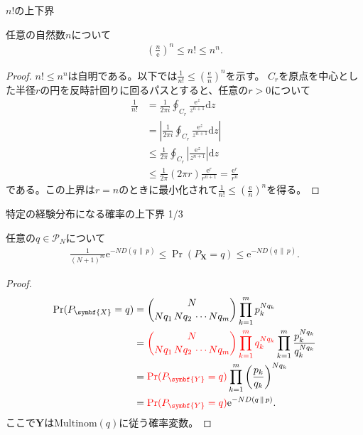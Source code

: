 \documentclass[lualatex,handout]{beamer}
\newcommand{\mycolor}[2]{%
  \begingroup
  \colorlet{currentcolor}{.}%
  \color{#1}#2%
  \color{currentcolor}%
  \endgroup
}
\newcommand{\emm}[1]{\mycolor{red}{#1}}
\newcommand\KL[2]{D(#1\,\|\,#2)}
\theoremstyle{definition}
\begin{document}
\begin{frame}{$n!$の上下界}
\footnotesize
\begin{lemma}
任意の自然数$n$について
\begin{align*}
\left(\frac{n}{\mathrm{e}}\right)^n\le n!\le n^n.
\end{align*}
\vspace{-1em}
\begin{proof}
$n!\le n^n$は自明である。以下では$\frac1{n!}\le \left(\frac{\mathrm{e}}{n}\right)^n$を示す。
%
$C_r$を原点を中心とした半径$r$の円を反時計回りに回るパスとすると、任意の$r>0$について
\begin{align*}
\frac1{n!} &= \frac1{2\pi i} \oint_{C_r} \frac{\mathrm{e}^z}{z^{n+1}}\mathrm{d}z\\
 &= \left|\frac1{2\pi i} \oint_{C_r} \frac{\mathrm{e}^z}{z^{n+1}}\mathrm{d}z\right|\\
&\le \frac1{2\pi } \oint_{C_r} \left|\frac{\mathrm{e}^z}{z^{n+1}}\right|\mathrm{d}z\\
&\le \frac1{2\pi } (2\pi r) \frac{\mathrm{e}^r}{r^{n+1}} = \frac{\mathrm{e}^r}{r^n}
\end{align*}
である。この上界は$r=n$のときに最小化されて$\frac1{n!}\le\left(\frac{\mathrm{e}}{n}\right)^n$を得る。
\end{proof}
\end{lemma}
\end{frame}
\fi

\begin{frame}{特定の経験分布になる確率の上下界 1/3}
\small
\begin{lemma}
任意の$q\in\mathcal{P}_N$について
\begin{align*}
\frac1{(N+1)^m}\mathrm{e}^{-N \KL{q}{p}}\le
\Pr(P_{\symbf{X}} = q)
\le \mathrm{e}^{-N \KL{q}{p}}.
\end{align*}
\end{lemma}
\begin{proof}
\vspace{-2em}
\begin{align*}
\Pr(P_{\symbf{X}}= q) &= \binom{N}{Nq_1\,Nq_2\,\dotsm Nq_m} \prod_{k=1}^m p_k^{Nq_k}\\
 &= \emm{\binom{N}{Nq_1\,Nq_2\,\dotsm Nq_m} \prod_{k=1}^m q_k^{Nq_k}}\prod_{k=1}^m\frac{p_k^{Nq_k}}{q_k^{Nq_k}}\\
 &= \emm{\Pr(P_{\symbf{Y}}= q)}\prod_{k=1}^m\left(\frac{p_k}{q_k}\right)^{Nq_k}\\
 &=\emm{\Pr(P_{\symbf{Y}}= q)}\mathrm{e}^{-N \KL{q}{p}}.
\end{align*}
ここで$\symbf{Y}$は$\mathrm{Multinom}(q)$に従う確率変数。
\end{proof}
\end{frame}
\end{document}
